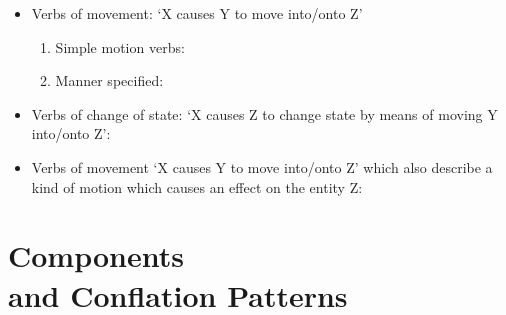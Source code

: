 \documentclass[headrule,footrule]{foils}
\begin{document}
\begin{itemize}
\item Verbs of movement: `X causes Y to move into/onto Z'
  \begin{enumerate}
  \item Simple motion verbs: 
  \item Manner specified: 
  \end{enumerate}
\item Verbs of change of state: `X causes Z to change state by means
  of moving Y into/onto Z': 
\\ [1.5ex]
\item Verbs of movement `X causes Y to move into/onto Z' which also
  describe a kind of motion which causes an effect on the entity Z: 
\\ [1.5ex]

\end{itemize}


\section{Components \\ and Conflation Patterns}
\MyLogo{}
\end{document}
